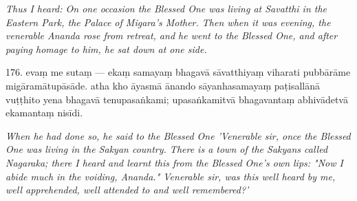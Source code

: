 \documentclass[10pt]{article}
\begin{document}
\begin{paracol}{2}
\begin{column}
{\itshape\footnotesize Thus I heard: On one occasion the Blessed One was living at Savatthi in the Eastern Park, the Palace of Migara's Mother. Then when it was evening, the venerable Ananda rose from retreat, and he went to the Blessed One, and after paying homage to him, he sat down at one side.}
\switchcolumn

176. evaṃ me sutaṃ — ekaṃ samayaṃ bhagavā sāvatthiyaṃ viharati pubbārāme migāramātupāsāde. atha kho āyasmā ānando sāyanhasamayaṃ paṭisallānā vuṭṭhito yena bhagavā tenupasaṅkami; upasaṅkamitvā bhagavantaṃ abhivādetvā ekamantaṃ nisīdi.
\switchcolumn*

{\itshape\footnotesize When he had done so, he said to the Blessed One 'Venerable sir, once the Blessed One was living in the Sakyan country. There is a town of the Sakyans called Nagaraka; there I heard and learnt this from the Blessed One's own lips: "Now I abide much in the voiding, Ananda." Venerable sir, was this well heard by me, well apprehended, well attended to and well remembered?'}
\switchcolumn


\end{column}
\end{paracol}
\end{document}
